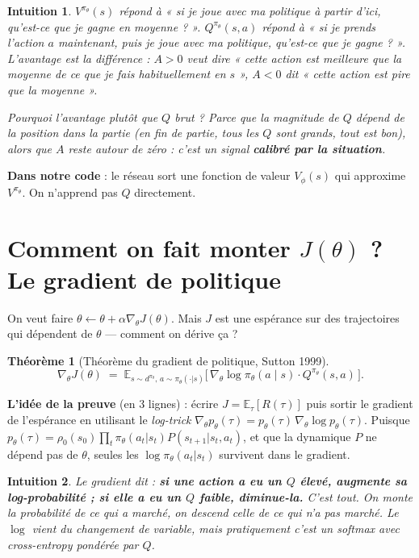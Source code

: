 \documentclass[a4paper,11pt]{article}
\theoremstyle{clean}
\newtheorem*{thm}{Théorème}
\newtheorem*{intu}{Intuition}
\newcommand{\E}{\mathbb{E}}
\newcommand{\piT}{\pi_{\theta}}
\begin{document}
\begin{intu}
$V^{\piT}(s)$ répond à « si je joue avec ma politique à partir d'ici, qu'est-ce que je gagne en moyenne ? ». $Q^{\piT}(s,a)$ répond à « si je prends l'action $a$ maintenant, puis je joue avec ma politique, qu'est-ce que je gagne ? ». L'avantage est la \emph{différence} : $A>0$ veut dire « cette action est meilleure que la moyenne de ce que je fais habituellement en $s$ », $A<0$ dit « cette action est pire que la moyenne ».

Pourquoi l'avantage plutôt que $Q$ brut ? Parce que la \emph{magnitude} de $Q$ dépend de la position dans la partie (en fin de partie, tous les $Q$ sont grands, tout est bon), alors que $A$ reste autour de zéro : c'est un signal \textbf{calibré par la situation}.
\end{intu}

\textbf{Dans notre code} : le réseau sort une fonction de valeur $V_\phi(s)$ qui approxime $V^{\piT}$. On n'apprend pas $Q$ directement.

\section{Comment on fait monter $J(\theta)$ ? Le gradient de politique}

On veut faire $\theta \leftarrow \theta + \alpha \nabla_\theta J(\theta)$. Mais $J$ est une espérance sur des trajectoires qui dépendent de $\theta$ --- comment on dérive ça ?

\begin{thm}[Théorème du gradient de politique, Sutton 1999]
\[
\nabla_\theta J(\theta) \;=\; \E_{s \sim d^{\piT},\, a \sim \piT(\cdot|s)}\!\big[\, \nabla_\theta \log \piT(a \mid s) \cdot Q^{\piT}(s,a) \,\big].
\]
\end{thm}

\textbf{L'idée de la preuve} (en 3 lignes) : écrire $J = \E_\tau[R(\tau)]$ puis sortir le gradient de l'espérance en utilisant le \emph{log-trick}
$\nabla_\theta p_\theta(\tau) = p_\theta(\tau)\, \nabla_\theta \log p_\theta(\tau)$.
Puisque $p_\theta(\tau)=\rho_0(s_0)\prod_t \piT(a_t|s_t) P(s_{t+1}|s_t,a_t)$, et que la dynamique $P$ ne dépend pas de $\theta$, seules les $\log\piT(a_t|s_t)$ survivent dans le gradient.

\begin{intu}
Le gradient dit : \textbf{si une action a eu un $Q$ élevé, augmente sa log-probabilité ; si elle a eu un $Q$ faible, diminue-la.} C'est tout. On monte la probabilité de ce qui a marché, on descend celle de ce qui n'a pas marché. Le $\log$ vient du changement de variable, mais pratiquement c'est un softmax avec cross-entropy pondérée par $Q$.
\end{intu}
\end{document}
